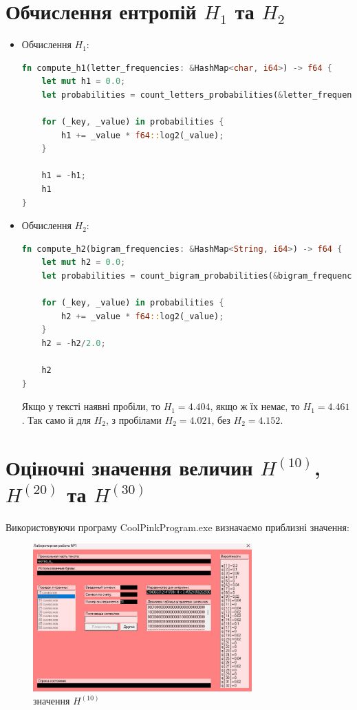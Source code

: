 \documentclass[12pt]{article}
\begin{document}
\section{Обчислення ентропій \(H_1\) та \(H_2\)}
\begin{itemize}
    \item Обчислення \(H_1\):
\begin{lstlisting}[language=Rust]
fn compute_h1(letter_frequencies: &HashMap<char, i64>) -> f64 {
    let mut h1 = 0.0;
    let probabilities = count_letters_probabilities(&letter_frequencies);

    for (_key, _value) in probabilities {
        h1 += _value * f64::log2(_value);
    }

    h1 = -h1;
    h1
}
\end{lstlisting}

\newpage
    \item Обчислення \(H_2\):
\begin{lstlisting}[language=Rust]
fn compute_h2(bigram_frequencies: &HashMap<String, i64>) -> f64 {
    let mut h2 = 0.0;
    let probabilities = count_bigram_probabilities(&bigram_frequencies);

    for (_key, _value) in probabilities {
        h2 += _value * f64::log2(_value);
    }
    h2 = -h2/2.0;
    
    h2
}
\end{lstlisting}
Якщо у тексті наявні пробіли, то \(H_1 = 4.404\), якщо ж їх немає, то \(H_1 = 4.461\). 
Так само й для \(H_2\), з пробілами \(H_2 = 4.021\), без \(H_2 = 4.152\).
\end{itemize}

\newpage
\section{Оціночні значення величин \(H^{(10)}\), \(H^{(20)}\) та \(H^{(30)}\)}
\quad Використовуючи програму CoolPinkProgram.exe визначаємо приблизні значення:
\begin{figure}[htbp]
    \centering
    \includegraphics[width=0.75\textwidth]{screenshots/h10.png}
    \caption{значення \(H^{(10)}\)}
    \label{fig:screenshot}
\end{figure}
\end{document}
